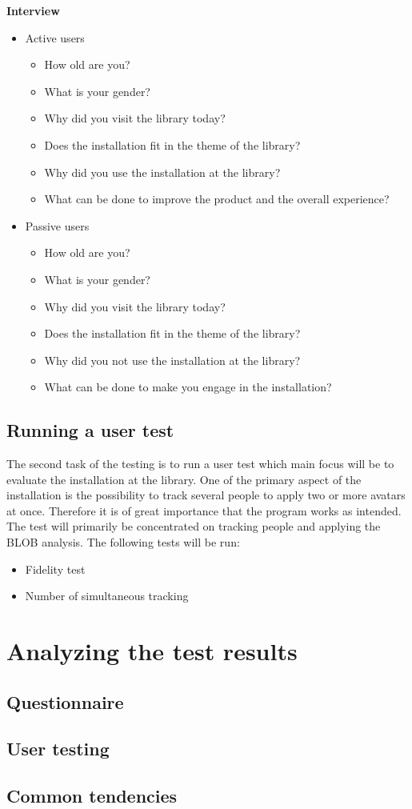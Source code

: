 \textbf{Interview}
\begin{itemize}
\item Active users
\begin{itemize}
\item How old are you?
\item What is your gender?
\item Why did you visit the library today?
\item Does the installation fit in the theme of the library?
\item Why did you use the installation at the library?
\item What can be done to improve the product and the overall experience?
\end{itemize}
\item Passive users
\begin{itemize}
\item How old are you?
\item What is your gender? 
\item Why did you visit the library today?
\item Does the installation fit in the theme of the library?
\item Why did you not use the installation at the library?
\item What can be done to make you engage in the installation?
\end{itemize}
\end{itemize}

\subsection{Running a user test}
The second task of the testing is to run a user test which main focus will be to evaluate the installation at the library. One of the primary aspect of the installation is the possibility to track several people to apply two or more avatars at once. Therefore it is of great importance that the program works as intended.\\
The test will primarily be concentrated on tracking people and applying the BLOB analysis. The following tests will be run:  
\begin{itemize}
\item Fidelity test
\item Number of simultaneous tracking
\end{itemize}

\section{Analyzing the test results}
\subsection{Questionnaire}
\subsection{User testing}
\subsection{Common tendencies}


